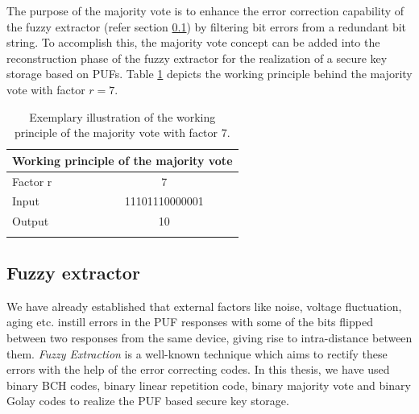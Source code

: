 The purpose of the majority vote is to enhance the error correction capability of the fuzzy extractor (refer section \ref{fuzzy_section}) by filtering bit errors from a redundant bit string. To accomplish this, the majority vote concept can be added into the reconstruction phase of the fuzzy extractor for the realization of a secure key storage based on PUFs. Table \ref{mv} depicts the working principle behind the majority vote with factor $r = 7$.

\begin{table}[!ht]
\begin{center}
\begin{tabular}{lc}
\toprule
\multicolumn{2}{c}{\textbf{Working principle of the majority vote}}\\
\midrule
Factor r & 7 \\
Input & 11101110000001\\
Output & 10\\
\addlinespace
\bottomrule
\end{tabular}
\end{center}
\caption{Exemplary illustration of the working principle of the majority vote with factor 7.}
\label{mv}
\end{table}

\subsection{Fuzzy extractor}
\label{fuzzy_section}
We have already established that external factors like noise, voltage fluctuation, aging etc. instill errors in the PUF responses with some of the bits flipped between two responses from the same device, giving rise to intra-distance between them. \emph{Fuzzy Extraction} is a well-known technique which aims to rectify these errors with the help of the error correcting codes. In this thesis, we have used binary BCH codes, binary linear repetition code, binary majority vote and binary Golay
codes to realize the PUF based secure key storage.\\

